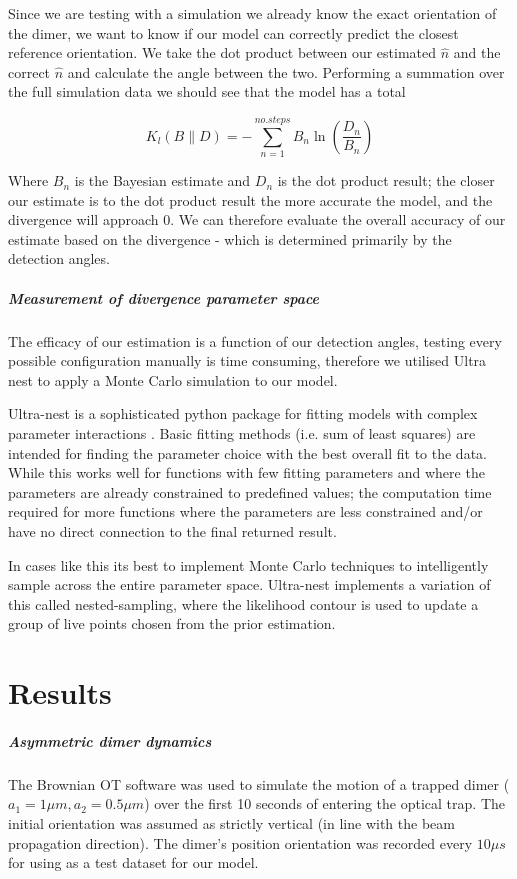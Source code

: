 \documentclass[11pt]{article}
\begin{document}
Since we are testing with a simulation we already know the exact orientation of the dimer, we want to know if our model can correctly predict the closest reference orientation. We take the dot product between our estimated $\hat{n}$ and the correct $\hat{n}$ and calculate the angle between the two. Performing a summation over the full simulation data we should see that the model has a total  

$$  K_l(B \parallel D) = - \sum_{n=1}^{no. steps} B_n \ln(\frac{D_n}{B_n})$$


Where $B_n$ is the Bayesian estimate and $D_n$ is the dot product result; the closer our estimate is to the dot product result the more accurate the model, and the divergence will approach 0. We can therefore evaluate the overall accuracy of our estimate based on the divergence - which is determined primarily by the detection angles. 

\subparagraph*{Measurement of divergence parameter space}
The efficacy of our estimation is a function of our detection angles, testing every possible configuration manually is time consuming, therefore we utilised Ultra nest to apply a Monte Carlo simulation to our model. 

Ultra-nest is a sophisticated python package for fitting models with complex parameter interactions \cite{3}. Basic fitting methods (i.e. sum of least squares) are intended for finding the parameter choice with the best overall fit to the data. While this works well for functions with few fitting parameters and where the parameters are already constrained to predefined values; the computation time required for more functions where the parameters are less constrained and/or have no direct connection to the final returned result. 

In cases like this its best to implement Monte Carlo techniques to intelligently sample across the entire parameter space. Ultra-nest implements a variation of this called nested-sampling, where the likelihood contour is used to update a group of live points chosen from the prior estimation.

\section*{Results}
\subparagraph*{Asymmetric dimer dynamics}
The Brownian OT software was used to simulate the motion of a trapped dimer ($a_1=1\mu m, a_2=0.5\mu m$) over the first 10 seconds of entering the optical trap. The initial orientation was assumed as strictly vertical (in line with the beam propagation direction). The dimer's position orientation was recorded every $10 \mu s$ for using as a test dataset for our model. 
\end{document}
